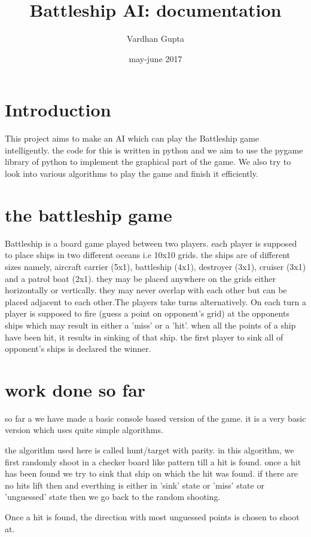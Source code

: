 \documentclass{article}
\title{Battleship AI: documentation}
\author{Vardhan Gupta}
\date{may-june 2017}
\begin{document}
   \maketitle
   \tableofcontents
   \section{Introduction}
   This project aims to make an AI which can play the Battleship game intelligently. the code for this is written in python and we aim to use the pygame library of python to implement the graphical part of the game. We also try to look into various algorithms to play the game and finish it efficiently.
   
   \section{the battleship game}
   Battleship is a board game played between two players. each player is supposed to place ships in two different oceans i.e 10x10 grids. the ships are of different sizes namely, aircraft carrier (5x1), battleship (4x1), destroyer (3x1), cruiser (3x1) and a patrol boat (2x1). they may be placed anywhere on the grids either horizontally or vertically. they may never overlap with each other but can be placed adjacent to each other.The players take turns alternatively. On each turn a player is supposed to fire (guess a point on opponent's grid) at the opponents ships which may result in either a 'miss' or a 'hit'. when all the points of a ship have been hit, it results in sinking of that ship. the first player to sink all of opponent's ships is declared the winner.
   
   \section{work done so far}
   so far a we have made a basic console based version of the game. it is a very basic version which uses quite simple algorithms.
   
   the algorithm used here is called hunt/target with parity. in this algorithm, we first randomly shoot in a checker board like pattern till a hit is found. once a hit has been found we try to sink that ship on which the hit was found. if there are no hits lift then and everthing is either in 'sink' state or 'miss' state or 'unguessed' state then we go back to the random shooting.
   
   Once a hit is found, the direction with most unguessed points is chosen to shoot at.
\end{document}
